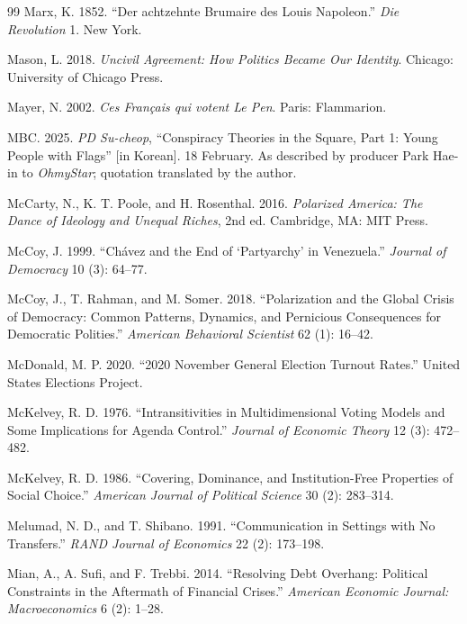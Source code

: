 \documentclass[12pt,letterpaper]{article}
\begin{document}
\begin{thebibliography}{99}
Marx, K. 1852. ``Der achtzehnte Brumaire des Louis Napoleon.'' \textit{Die Revolution} 1. New York.

Mason, L. 2018. \textit{Uncivil Agreement: How Politics Became Our Identity}. Chicago: University of Chicago Press.

Mayer, N. 2002. \textit{Ces Fran\c{c}ais qui votent Le Pen}. Paris: Flammarion.

MBC. 2025. \textit{PD Su-cheop}, ``Conspiracy Theories in the Square, Part 1: Young People with Flags'' [in Korean]. 18 February. As described by producer Park Hae-in to \textit{OhmyStar}; quotation translated by the author.

McCarty, N., K. T. Poole, and H. Rosenthal. 2016. \textit{Polarized America: The Dance of Ideology and Unequal Riches}, 2nd ed. Cambridge, MA: MIT Press.

McCoy, J. 1999. ``Chávez and the End of `Partyarchy' in Venezuela.'' \textit{Journal of Democracy} 10 (3): 64--77.

McCoy, J., T. Rahman, and M. Somer. 2018. ``Polarization and the Global Crisis of Democracy: Common Patterns, Dynamics, and Pernicious Consequences for Democratic Polities.'' \textit{American Behavioral Scientist} 62 (1): 16--42.

McDonald, M. P. 2020. ``2020 November General Election Turnout Rates.'' United States Elections Project.

McKelvey, R. D. 1976. ``Intransitivities in Multidimensional Voting Models and Some Implications for Agenda Control.'' \textit{Journal of Economic Theory} 12 (3): 472--482.

McKelvey, R. D. 1986. ``Covering, Dominance, and Institution-Free Properties of Social Choice.'' \textit{American Journal of Political Science} 30 (2): 283--314.

Melumad, N. D., and T. Shibano. 1991. ``Communication in Settings with No Transfers.'' \textit{RAND Journal of Economics} 22 (2): 173--198.

Mian, A., A. Sufi, and F. Trebbi. 2014. ``Resolving Debt Overhang: Political Constraints in the Aftermath of Financial Crises.'' \textit{American Economic Journal: Macroeconomics} 6 (2): 1--28.


\end{thebibliography}
\end{document}
